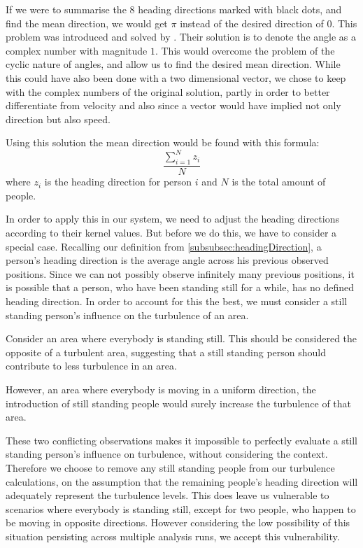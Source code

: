 If we were to summarise the 8 heading directions marked with black dots, and find the mean direction, we would get $\pi$ instead of the desired direction of $0$. This problem was introduced and solved by \citet{localTrendStatistics}. Their solution is to denote the angle as a complex number with magnitude $1$. This would overcome the problem of the cyclic nature of angles, and allow us to find the desired mean direction. While this could have also been done with a two dimensional vector, we chose to keep with the complex numbers of the original solution, partly in order to better differentiate from velocity and also since a vector would have implied not only direction but also speed.

Using this solution the mean direction would be found with this formula: $$\frac{\sum_{i=1}^{N} z_i}{N}$$ where $z_i$ is the heading direction for person $i$ and $N$ is the total amount of people.

In order to apply this in our system, we need to adjust the heading directions according to their kernel values. But before we do this, we have to consider a special case. Recalling our definition from \cref{subsubsec:headingDirection}, a person's heading direction is the average angle across his previous observed positions. Since we can not possibly observe infinitely many previous positions, it is possible that a person, who have been standing still for a while, has no defined heading direction. In order to account for this the best, we must consider a still standing person's influence on the turbulence of an area.

Consider an area where everybody is standing still. This should be considered the opposite of a turbulent area, suggesting that a still standing person should contribute to less turbulence in an area.

However, an area where everybody is moving in a uniform direction, the introduction of still standing people would surely increase the turbulence of that area.

These two conflicting observations makes it impossible to perfectly evaluate a still standing person's influence on turbulence, without considering the context. Therefore we choose to remove any still standing people from our turbulence calculations, on the assumption that the remaining people's heading direction will adequately represent the turbulence levels. This does leave us vulnerable to scenarios where everybody is standing still, except for two people, who happen to be moving in opposite  directions. However considering the low possibility of this situation persisting across multiple analysis runs, we accept this vulnerability.

